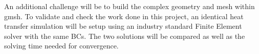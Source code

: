 \documentclass[11pt]{article}
\begin{document}
An additional challenge will be to build the complex geometry and mesh within gmsh.
To validate and check the work done in this project, an identical heat transfer simulation will be setup using an industry standard Finite Element solver with the same BCs. The two solutions will be compared as well as the solving time needed for convergence.
\end{document}
